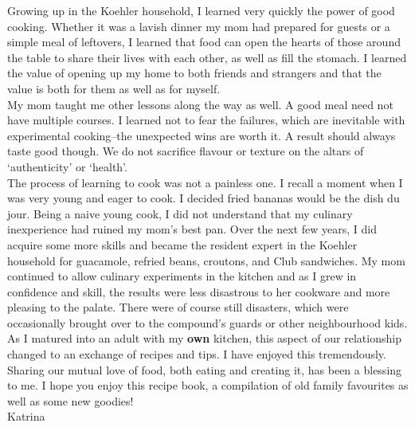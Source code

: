 \documentclass[10pt]{memoir} %
\begin{document}
Growing up in the Koehler household, I learned very quickly the power of good cooking. Whether it was a lavish dinner my mom had prepared for guests or a simple meal of leftovers, I learned that food can open the hearts of those around the table to share their lives with each other, as well as fill the stomach. I learned the value of opening up my home to both friends and strangers and that the value is both for them as well as for myself. \\[10pt]
My mom taught me other lessons along the way as well. A good meal need not have multiple courses. I learned not to fear the failures, which are inevitable with experimental cooking--the unexpected wins are worth it. A result should always taste good though. We do not sacrifice flavour or texture on the altars of `authenticity' or `health'. \\[10pt]
The process of learning to cook was not a painless one. I recall a moment when I was very young and eager to cook. I decided fried bananas would be the dish du jour. Being a naive young cook, I did not understand that my culinary inexperience had ruined my mom's best pan. Over the next few years, I did acquire some more skills and became the resident expert in the Koehler household for guacamole, refried beans, croutons, and Club sandwiches. My mom continued to allow culinary experiments in the kitchen and as I grew in confidence and skill, the results were less disastrous to her cookware and more pleasing to the palate. There were of course still disasters, which were occasionally brought over to the compound's guards or other neighbourhood kids. \\[10pt]
As I matured into an adult with my \textbf{own} kitchen, this aspect of our relationship changed to an exchange of recipes and tips. I have enjoyed this tremendously. Sharing our mutual love of food, both eating and creating it, has been a blessing to me. I hope you enjoy this recipe book, a compilation of old family favourites as well as some new goodies! \\[10pt]
\hspace{0.5\linewidth}Katrina
\end{document}
